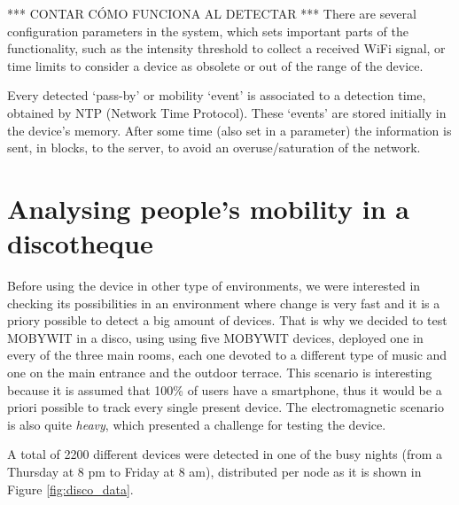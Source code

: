 \documentclass[preprint]{elsarticle}
\begin{document}
*** CONTAR CÓMO FUNCIONA AL DETECTAR ***
There are several configuration parameters in the system, which sets important parts of the functionality, such as the intensity threshold to collect a received WiFi signal, or time limits to consider a device as obsolete or out of the range of the device.

Every detected `pass-by' or mobility `event' is associated to a detection time, obtained by NTP (Network Time Protocol). These `events' are stored initially in the device's memory. After some time (also set in a parameter) the information is sent, in blocks, to the server, to avoid an overuse/saturation of the network.



\section{Analysing people's mobility in a discotheque}
\label{sec:disco}

Before using the device in other type of environments, we were
interested in checking its possibilities in an environment where
change is very fast and it is a priory possible to detect a big amount
of devices. That is why we decided to test MOBYWIT in a disco, using
using five MOBYWIT devices, deployed one in every of the three main
rooms, each one devoted to a different type of music and one on the main
entrance and the outdoor terrace. This scenario is interesting because
it is assumed that 100\% of users have a smartphone, thus it would be
a priori possible to track every single present device. The
electromagnetic scenario is also quite {\em heavy}, which presented a
challenge for testing the device.

A total of 2200 different devices were detected in one of the busy
nights (from a Thursday at 8 pm to Friday at 8 am), distributed per
node as it is shown in Figure \ref{fig:disco_data}. 
\end{document}
